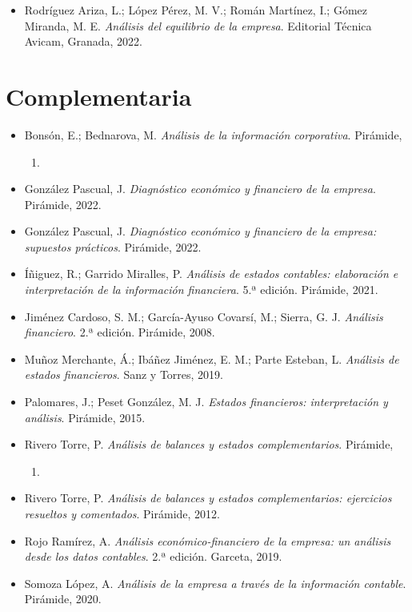 \documentclass[12pt]{book} %
\providecommand{\tightlist}{%
  \setlength{\itemsep}{0pt}\setlength{\parskip}{0pt}}
\begin{document}
\begin{itemize}
\tightlist
\item
  Rodríguez Ariza, L.; López Pérez, M. V.; Román Martínez, I.; Gómez
  Miranda, M. E. \emph{Análisis del equilibrio de la empresa}. Editorial
  Técnica Avicam, Granada, 2022.
\end{itemize}

\hypertarget{complementaria}{%
\section{Complementaria}\label{complementaria}}

\begin{itemize}
\tightlist
\item
  Bonsón, E.; Bednarova, M. \emph{Análisis de la información
  corporativa}. Pirámide,

  \begin{enumerate}
  \def\labelenumi{\arabic{enumi}.}
  \setcounter{enumi}{2020}
  \tightlist
  \item
  \end{enumerate}
\item
  González Pascual, J. \emph{Diagnóstico económico y financiero de la
  empresa}. Pirámide, 2022.
\item
  González Pascual, J. \emph{Diagnóstico económico y financiero de la
  empresa: supuestos prácticos}. Pirámide, 2022.
\item
  Íñiguez, R.; Garrido Miralles, P. \emph{Análisis de estados contables:
  elaboración e interpretación de la información financiera}. 5.ª
  edición. Pirámide, 2021.
\item
  Jiménez Cardoso, S. M.; García-Ayuso Covarsí, M.; Sierra, G. J.
  \emph{Análisis financiero}. 2.ª edición. Pirámide, 2008.
\item
  Muñoz Merchante, Á.; Ibáñez Jiménez, E. M.; Parte Esteban, L.
  \emph{Análisis de estados financieros}. Sanz y Torres, 2019.
\item
  Palomares, J.; Peset González, M. J. \emph{Estados financieros:
  interpretación y análisis}. Pirámide, 2015.
\item
  Rivero Torre, P. \emph{Análisis de balances y estados
  complementarios}. Pirámide,

  \begin{enumerate}
  \def\labelenumi{\arabic{enumi}.}
  \setcounter{enumi}{2010}
  \tightlist
  \item
  \end{enumerate}
\item
  Rivero Torre, P. \emph{Análisis de balances y estados complementarios:
  ejercicios resueltos y comentados}. Pirámide, 2012.
\item
  Rojo Ramírez, A. \emph{Análisis económico-financiero de la empresa: un
  análisis desde los datos contables}. 2.ª edición. Garceta, 2019.
\item
  Somoza López, A. \emph{Análisis de la empresa a través de la
  información contable}. Pirámide, 2020.
\end{itemize}


\end{document}
